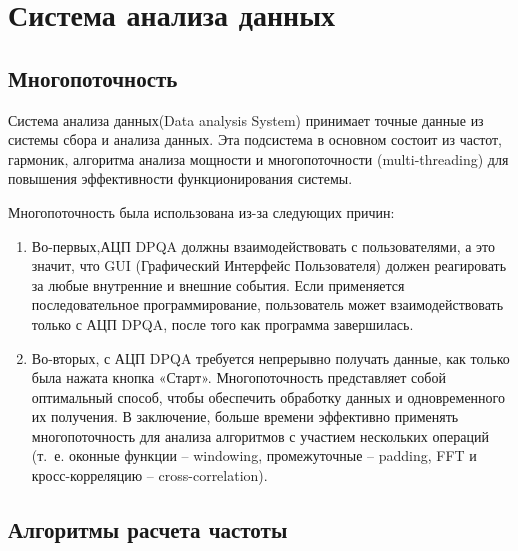 
\chapter{Система анализа данных} \label{ch:ch2}

\section{Многопоточность} \label{sec:ch2/sec1}

Система анализа данных(Data analysis System) принимает точные данные из системы сбора и анализа данных. Эта подсистема в основном состоит из частот, гармоник, алгоритма анализа мощности и многопоточности (multi-threading) для повышения эффективности функционирования системы. 

Многопоточность была использована из-за следующих причин:
\begin{enumerate}
	\item Во-первых,АЦП DPQA должны взаимодействовать с пользователями, а это значит, что GUI (Графический Интерфейс Пользователя) должен реагировать за любые внутренние и внешние события. Если применяется последовательное программирование, пользователь может взаимодействовать только с АЦП DPQA, после того как программа завершилась. 
	
	\item Во-вторых, с АЦП DPQA требуется непрерывно получать данные, как только была нажата кнопка «Старт». Многопоточность представляет собой оптимальный способ, чтобы обеспечить обработку данных и одновременного их получения. В заключение, больше времени эффективно применять многопоточность для анализа алгоритмов с участием нескольких операций (т.~е. оконные функции – windowing, промежуточные – padding, FFT и кросс-корреляцию – cross-correlation). 
\end{enumerate}

\section{Алгоритмы расчета частоты} \label{sec:ch2/sec2}

